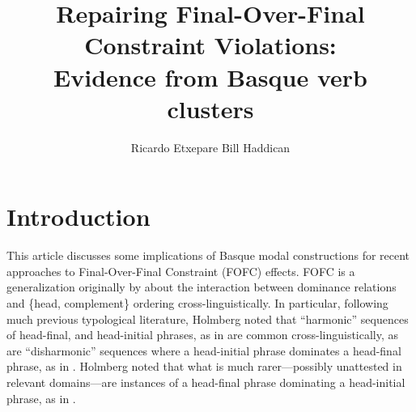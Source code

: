 \documentclass[output=paper]{langscibook}
\title{Repairing Final-Over-Final Constraint Violations: \\Evidence from Basque verb clusters}
\author{%
 Ricardo Etxepare\affiliation{IKER UMR 5478-CNRS}  
 \lastand 
 Bill Haddican\affiliation{CUNY, Queens College/Graduate Center}
}
\begin{document}
\maketitle








\section{Introduction} \protect\label{introduction}
This article discusses some implications of Basque modal constructions for recent approaches to  Final-Over-Final Constraint (FOFC) effects.  FOFC is a  generalization originally by \cite{holmberg2000} about the interaction between dominance relations and \{head, complement\} ordering cross-linguistically.   In particular, following much previous typological literature, Holmberg  noted that  ``harmonic'' sequences of  head-final, and head-initial phrases, as in \Next[a,b] are common cross-linguistically, as are ``disharmonic'' sequences where a head-initial phrase dominates a head-final phrase, as in \Next[c] \citep{hawkins1983, hawkins1995}.  Holmberg noted that what is much rarer---possibly unattested in relevant domains---are instances of a head-final phrase dominating a head-initial phrase, as in \Next[d].
\end{document}
